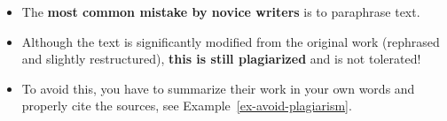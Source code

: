\documentclass[11pt,a4paper]{article}
\begin{document}
\begin{badexample}
  \begin{figure}[H]
    \centering%
    {%
      \setlength{\fboxsep}{0pt}%
      \setlength{\fboxrule}{2pt}%
    }
  \end{figure}
  \begin{itemize}
    \item The \textbf{most common mistake by novice writers} is to paraphrase text.
    \item Although the text is significantly modified from the original work (rephrased and slightly restructured), \textbf{this is still plagiarized} and is not tolerated!
    \item To avoid this, you have to summarize their work in your own words and properly cite the sources, see Example~\ref{ex-avoid-plagiarism}.
  \end{itemize}
\end{badexample}
\end{document}
